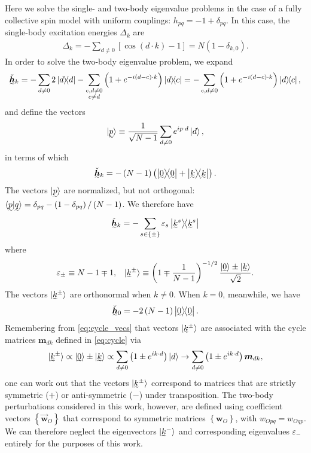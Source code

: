 \documentclass[nofootinbib,notitlepage,11pt]{revtex4-2}
\newcommand{\f}[2]{\dfrac{#1}{#2}} %
\newcommand{\p}[1]{\left(#1\right)} %
\renewcommand{\sp}[1]{\left[#1\right]} %
\renewcommand{\set}[1]{\left\{#1\right\}} %
\renewcommand{\c}{\cdot} %
\newcommand{\m}{\bm} %
\renewcommand{\v}{\vec} %
\newcommand{\1}{\mathds{1}}
\newcommand{\ut}{\undertilde}
\begin{document}
Here we solve the single- and two-body eigenvalue problems in the case
of a fully collective spin model with uniform couplings:
$h_{pq}=-1+\delta_{pq}$.  In this case, the single-body excitation
energies $\Delta_k$ are
\begin{align}
  \Delta_k
  = - \sum_{d\ne 0} \sp{\cos\p{d\c k}-1}
  = N \p{1-\delta_{k,0}}.
\end{align}
In order to solve the two-body eigenvalue problem, we expand
\begin{align}
  \ut{\check{\m h}}_k
  = - \sum_{d\ne0} 2 \op{d}
  - \sum_{\substack{c,d\ne0\\c\ne d}} \p{1+e^{-i\p{d-c}\c k}} \op{d}{c}
  = - \sum_{c,d\ne0} \p{1+e^{-i\p{d-c}\c k}} \op{d}{c},
\end{align}
and define the vectors
\begin{align}
  \ket{\ut{p}}
  \equiv \f1{\sqrt{N-1}} \sum_{d\ne 0} e^{i p\c d}\ket{d},
\end{align}
in terms of which
\begin{align}
  \ut{\check{\m h}}_k
  = -\p{N-1} \p{\op{\ut{0}} + \op{\ut{k}}}.
\end{align}
The vectors $\ket{\ut{p}}$ are normalized, but not orthogonal:
$\braket{\ut{p}|\ut{q}}=\delta_{pq}-\p{1-\delta_{pq}}/\p{N-1}$.  We
therefore have
\begin{align}
  \ut{\check{\m h}}_k
  = - \sum_{s\in\set{\pm}} \varepsilon_s \op{\ut{k}^s}
\end{align}
where
\begin{align}
  \varepsilon_\pm \equiv N - 1 \mp 1,
  &&
  \ket{\ut{k}^\pm}
  \equiv \p{1\mp\f1{N-1}}^{-1/2}
  \f{\ket{\ut{0}}\pm\ket{\ut{k}}}{\sqrt{2}}.
\end{align}
The vectors $\ket{\ut{k}^\pm}$ are orthonormal when $k\ne0$.  When
$k=0$, meanwhile, we have
\begin{align}
  \ut{\check{\m h}}_0 = -2\p{N-1} \op{\ut{0}}.
\end{align}
Remembering from \eqref{eq:cycle_vecs} that vectors $\ket{\ut{k}^\pm}$
are associated with the cycle matrices $\m m_{dk}$ defined in
\eqref{eq:cycle} via
\begin{align}
  \ket{\ut{k}^\pm}
  \propto \ket{\ut{0}} \pm \ket{\ut{k}}
  \propto \sum_{d\ne0} \p{1 \pm e^{ik\c d}} \ket{d}
  \to \sum_{d\ne0} \p{1 \pm e^{ik\c d}} \m m_{dk},
\end{align}
one can work out that the vectors $\ket{\ut{k}^\pm}$ correspond to
matrices that are strictly symmetric ($+$) or anti-symmetric ($-$)
under transposition.  The two-body perturbations considered in this
work, however, are defined using coefficient vectors
$\set{\v{\m w}_O}$ that correspond to symmetric matrices
$\set{\m w_O}$, with $w_{Opq}=w_{Oqp}$.  We can therefore neglect the
eigenvectors $\ket{\ut{k}^-}$ and corresponding eigenvalues
$\varepsilon_-$ entirely for the purposes of this work.
\end{document}
